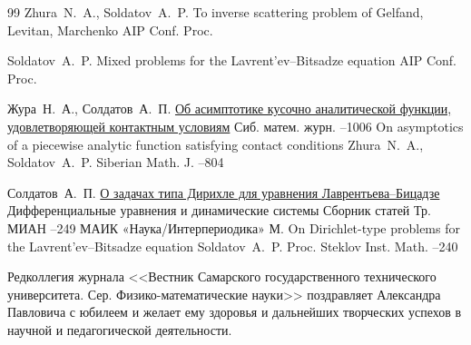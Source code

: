 \begin{thebibliography}{99}
\by Zhura~N.~A., Soldatov~A.~P.
\paper To inverse scattering problem of Gelfand, Levitan, Marchenko
\jour AIP Conf. Proc.


\by Soldatov~A.~P.
\paper Mixed problems for the Lavrent'ev--Bitsadze equation
\jour AIP Conf. Proc.


\by Жура~Н.~А., Солдатов~А.~П.
\paper \href{http://mi.mathnet.ru/smj2325}{Об асимптотике кусочно аналитической функции, удовлетворяющей контактным условиям}
\jour Сиб. матем. журн.
--1006
\transl
\paper On asymptotics of a piecewise analytic function satisfying contact conditions
\by \linebreak Zhura~N.~A.,  Soldatov~A.~P.
\jour Siberian Math. J.
--804

\by Солдатов~А.~П.
\paper \href{http://mi.mathnet.ru/tm3402}{О задачах типа Дирихле для уравнения Лаврентьева--Бицадзе}
\inbook Дифференциальные уравнения и динамические системы
\bookinfo Сборник статей
\serial Тр. МИАН
--249
\publ МАИК «Наука/Интерпериодика»
\publaddr М.
\transl
\paper On Dirichlet-type problems for the Lavrent'ev--Bitsadze equation
\by  Soldatov~A.~P.
\jour Proc. Steklov Inst. Math.
--240


\end{thebibliography}

\vfill


Редколлегия журнала <<Вестник Самарского государственного технического университета. Сер. Физико-математические науки>> поздравляет Александра Павловича с юбилеем и желает ему здоровья и дальнейших творческих успехов в научной и педагогической деятельности.

